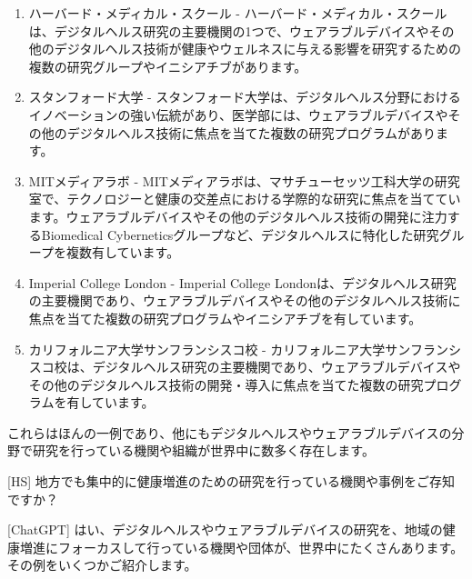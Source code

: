 \documentclass[
]{book}
\providecommand{\tightlist}{%
  \setlength{\itemsep}{0pt}\setlength{\parskip}{0pt}}
\theoremstyle{definition}
\theoremstyle{definition}
\theoremstyle{definition}
\theoremstyle{definition}
\theoremstyle{remark}
\begin{document}
\begin{enumerate}
\def\labelenumi{\arabic{enumi}.}
\tightlist
\item
  ハーバード・メディカル・スクール - ハーバード・メディカル・スクールは、デジタルヘルス研究の主要機関の1つで、ウェアラブルデバイスやその他のデジタルヘルス技術が健康やウェルネスに与える影響を研究するための複数の研究グループやイニシアチブがあります。
\item
  スタンフォード大学 - スタンフォード大学は、デジタルヘルス分野におけるイノベーションの強い伝統があり、医学部には、ウェアラブルデバイスやその他のデジタルヘルス技術に焦点を当てた複数の研究プログラムがあります。
\item
  MITメディアラボ - MITメディアラボは、マサチューセッツ工科大学の研究室で、テクノロジーと健康の交差点における学際的な研究に焦点を当てています。ウェアラブルデバイスやその他のデジタルヘルス技術の開発に注力するBiomedical Cyberneticsグループなど、デジタルヘルスに特化した研究グループを複数有しています。
\item
  Imperial College London - Imperial College Londonは、デジタルヘルス研究の主要機関であり、ウェアラブルデバイスやその他のデジタルヘルス技術に焦点を当てた複数の研究プログラムやイニシアチブを有しています。
\item
  カリフォルニア大学サンフランシスコ校 - カリフォルニア大学サンフランシスコ校は、デジタルヘルス研究の主要機関であり、ウェアラブルデバイスやその他のデジタルヘルス技術の開発・導入に焦点を当てた複数の研究プログラムを有しています。
\end{enumerate}

これらはほんの一例であり、他にもデジタルヘルスやウェアラブルデバイスの分野で研究を行っている機関や組織が世界中に数多く存在します。

{[}HS{]} 地方でも集中的に健康増進のための研究を行っている機関や事例をご存知ですか？

{[}ChatGPT{]} はい、デジタルヘルスやウェアラブルデバイスの研究を、地域の健康増進にフォーカスして行っている機関や団体が、世界中にたくさんあります。その例をいくつかご紹介します。
\end{document}
